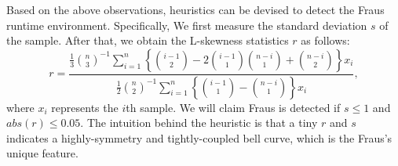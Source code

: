 \documentclass[conference]{IEEEtranl}
\begin{document}

	Based on the above observations, heuristics can be devised to detect the Fraus runtime environment. Specifically,
	We first measure the standard deviation $s$ of the sample. After that, we  obtain the L-skewness statistics $r$ \cite{joanes1998comparing} as follows:
	\begin{equation}
	r = \frac{\frac{1}{3}\binom{n}{3}^{-1}\sum_{i=1}^{n}\left \{ \binom{i-1}{2} - 2\binom{i-1}{1}\binom{n-i}{1} + \binom{n-i}{2} \right \}x_i}
	{\frac{1}{2}\binom{n}{2}^{-1}\sum_{i=1}^{n}\left \{ \binom{i-1}{1} - \binom{n-i}{1} \right \}x_i},
	\end{equation}
	where $x_i$ represents the $i$th sample. We will claim Fraus is detected if $s \le 1$ and $abs(r) \le 0.05$. The intuition behind the
	heuristic is that a tiny $r$ and $s$ indicates a highly-symmetry and tightly-coupled bell curve, which is the Fraus's unique feature. 




\end{document}
